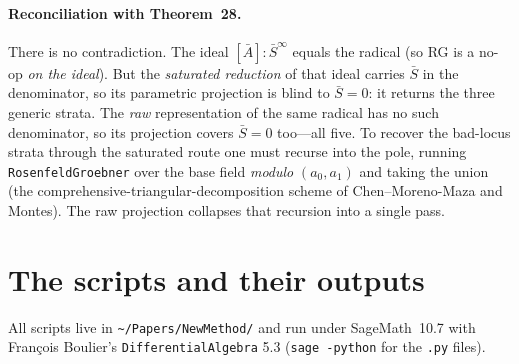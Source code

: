 \documentclass[11pt]{article}
\newcommand{\sat}[2]{[#1]\!:\!#2^{\infty}}
\newcommand{\Sbar}{\bar S}
\newcommand{\code}[1]{\texttt{#1}}
\begin{document}
\paragraph{Reconciliation with Theorem~28.} There is no contradiction. The ideal
$\sat{\bar A}{\Sbar}$ equals the radical (so RG is a no-op \emph{on the ideal}).
But the \emph{saturated reduction} of that ideal carries $\Sbar$ in the
denominator, so its parametric projection is blind to $\Sbar=0$: it returns the
three generic strata. The \emph{raw} representation of the same radical has no
such denominator, so its projection covers $\Sbar=0$ too---all five. To recover
the bad-locus strata through the saturated route one must recurse into the pole,
running \code{RosenfeldGroebner} over the base field \emph{modulo} $(a_0,a_1)$
and taking the union (the comprehensive-triangular-decomposition scheme of
Chen--Moreno-Maza and Montes). The raw projection collapses that recursion into
a single pass.

\section{The scripts and their outputs}

All scripts live in \code{\textasciitilde/Papers/NewMethod/} and run under
SageMath~10.7 with Fran\c{c}ois Boulier's \code{DifferentialAlgebra} 5.3
(\code{sage -python} for the \code{.py} files).
\end{document}
